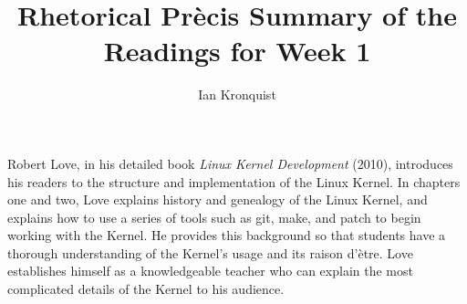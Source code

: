 \documentclass[12pt,letterpaper]{article}
\begin{document}
\title{Rhetorical Pr\`{e}cis Summary of the Readings for Week 1}
\author{Ian Kronquist}
\maketitle


\vspace{2cm}

Robert Love, in his detailed book \textit{Linux Kernel Development} (2010), introduces his readers to the structure and implementation of the Linux Kernel.
In chapters one and two, Love explains history and genealogy of the Linux Kernel, and explains how to use a series of tools such as git, make, and patch to begin working with the Kernel.
He provides this background so that students have a thorough understanding of the Kernel's usage and its raison d'\`{e}tre.
Love establishes himself as a knowledgeable teacher who can explain the most complicated details of the Kernel to his audience.
\end{document}

